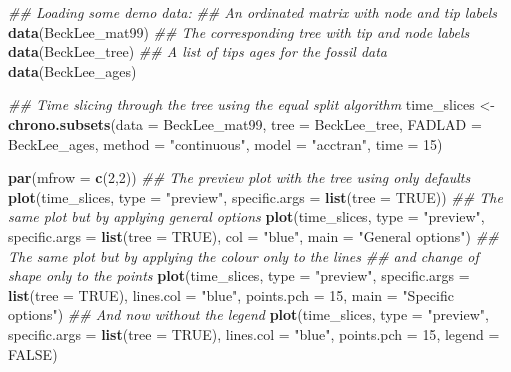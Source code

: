 \documentclass[
]{book}
\newenvironment{Shaded}{\begin{snugshade}}{\end{snugshade}}
\newcommand{\CommentTok}[1]{\textcolor[rgb]{0.56,0.35,0.01}{\textit{#1}}}
\newcommand{\DataTypeTok}[1]{\textcolor[rgb]{0.13,0.29,0.53}{#1}}
\newcommand{\DecValTok}[1]{\textcolor[rgb]{0.00,0.00,0.81}{#1}}
\newcommand{\KeywordTok}[1]{\textcolor[rgb]{0.13,0.29,0.53}{\textbf{#1}}}
\newcommand{\NormalTok}[1]{#1}
\newcommand{\OtherTok}[1]{\textcolor[rgb]{0.56,0.35,0.01}{#1}}
\newcommand{\StringTok}[1]{\textcolor[rgb]{0.31,0.60,0.02}{#1}}
\begin{document}
\begin{Shaded}
\begin{Highlighting}[]
\CommentTok{\#\# Loading some demo data:}
\CommentTok{\#\# An ordinated matrix with node and tip labels}
\KeywordTok{data}\NormalTok{(BeckLee\_mat99)}
\CommentTok{\#\# The corresponding tree with tip and node labels}
\KeywordTok{data}\NormalTok{(BeckLee\_tree)}
\CommentTok{\#\# A list of tips ages for the fossil data}
\KeywordTok{data}\NormalTok{(BeckLee\_ages)}

\CommentTok{\#\# Time slicing through the tree using the equal split algorithm}
\NormalTok{time\_slices \textless{}{-}}\StringTok{ }\KeywordTok{chrono.subsets}\NormalTok{(}\DataTypeTok{data   =}\NormalTok{ BeckLee\_mat99,}
                              \DataTypeTok{tree   =}\NormalTok{ BeckLee\_tree,}
                              \DataTypeTok{FADLAD =}\NormalTok{ BeckLee\_ages,}
                              \DataTypeTok{method =} \StringTok{"continuous"}\NormalTok{,}
                              \DataTypeTok{model  =} \StringTok{"acctran"}\NormalTok{,}
                              \DataTypeTok{time   =} \DecValTok{15}\NormalTok{)}

\KeywordTok{par}\NormalTok{(}\DataTypeTok{mfrow =} \KeywordTok{c}\NormalTok{(}\DecValTok{2}\NormalTok{,}\DecValTok{2}\NormalTok{))}
\CommentTok{\#\# The preview plot with the tree using only defaults}
\KeywordTok{plot}\NormalTok{(time\_slices, }\DataTypeTok{type =} \StringTok{"preview"}\NormalTok{, }\DataTypeTok{specific.args =} \KeywordTok{list}\NormalTok{(}\DataTypeTok{tree =} \OtherTok{TRUE}\NormalTok{))}
\CommentTok{\#\# The same plot but by applying general options}
\KeywordTok{plot}\NormalTok{(time\_slices, }\DataTypeTok{type =} \StringTok{"preview"}\NormalTok{, }\DataTypeTok{specific.args =} \KeywordTok{list}\NormalTok{(}\DataTypeTok{tree =} \OtherTok{TRUE}\NormalTok{),}
     \DataTypeTok{col =} \StringTok{"blue"}\NormalTok{, }\DataTypeTok{main =} \StringTok{"General options"}\NormalTok{)}
\CommentTok{\#\# The same plot but by applying the colour only to the lines}
\CommentTok{\#\# and change of shape only to the points}
\KeywordTok{plot}\NormalTok{(time\_slices, }\DataTypeTok{type =} \StringTok{"preview"}\NormalTok{, }\DataTypeTok{specific.args =} \KeywordTok{list}\NormalTok{(}\DataTypeTok{tree =} \OtherTok{TRUE}\NormalTok{),}
     \DataTypeTok{lines.col =} \StringTok{"blue"}\NormalTok{, }\DataTypeTok{points.pch =} \DecValTok{15}\NormalTok{, }\DataTypeTok{main =} \StringTok{"Specific options"}\NormalTok{)}
\CommentTok{\#\# And now without the legend}
\KeywordTok{plot}\NormalTok{(time\_slices, }\DataTypeTok{type =} \StringTok{"preview"}\NormalTok{, }\DataTypeTok{specific.args =} \KeywordTok{list}\NormalTok{(}\DataTypeTok{tree =} \OtherTok{TRUE}\NormalTok{),}
     \DataTypeTok{lines.col =} \StringTok{"blue"}\NormalTok{, }\DataTypeTok{points.pch =} \DecValTok{15}\NormalTok{, }\DataTypeTok{legend =} \OtherTok{FALSE}\NormalTok{)}
\end{Highlighting}
\end{Shaded}
\end{document}
